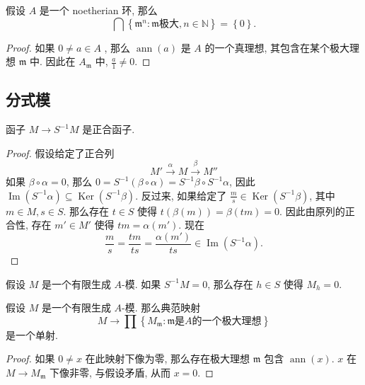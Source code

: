 \begin{proposition}
  假设 \( A \) 是一个 noetherian 环, 那么
  \[
    \bigcap \left\lbrace \mathfrak{m}^n: \mathfrak{m} \text{极大}, n \in
    \mathbb{N} \right\rbrace = \left\lbrace 0 \right\rbrace.
  \]
\end{proposition}
\begin{proof}
  如果 \( 0 \neq  a \in A \) , 那么 \( \operatorname{ann}(a) \) 是 \( A \)
  的一个真理想, 其包含在某个极大理想 \( \mathfrak{m} \) 中. 因此在 \(
  A_{\mathfrak{m}} \) 中, \( \frac{a}{1} \neq 0 \).
\end{proof}

\subsection{分式模}

\begin{proposition}
  函子 \( M \to S^{-1} M \) 是正合函子.
\end{proposition}
\begin{proof}
  假设给定了正合列
  \[
    M' \xrightarrow{\alpha} M \xrightarrow{\beta} M''
  \]
  如果 \( \beta \circ \alpha = 0 \), 那么 \( 0 = S^{-1}(\beta \circ \alpha) =
  S^{-1} \beta \circ S^{-1} \alpha \), 因此 \( \operatorname{Im} (S^{-1} \alpha)
  \subseteq \operatorname{Ker} (S^{-1}\beta) \). 反过来, 如果给定了 \(
  \frac{m}{s} \in \operatorname{Ker}(S^{-1}\beta) \), 其中 \( m \in M, s \in S
  \). 那么存在 \( t \in S \) 使得 \( t(\beta(m)) = \beta(tm) = 0 \).
  因此由原列的正合性, 存在 \( m' \in M' \) 使得 \( tm = \alpha(m') \). 现在
  \[
    \frac{m}{s} = \frac{tm}{ts} = \frac{\alpha(m')}{ts} \in
    \operatorname{Im}(S^{-1}\alpha).
  \]
\end{proof}

\begin{proposition}
  假设 \( M \) 是一个有限生成 \( A \)-模. 如果 \( S^{-1} M = 0 \), 那么存在 \( h
  \in S \) 使得 \( M_h = 0 \).
\end{proposition}

\begin{proposition}
  假设 \( M \) 是一个有限生成 \( A \)-模. 那么典范映射
  \[
    M \to \prod \left\lbrace M_{\mathfrak{m}}: \mathfrak{m} \text{是} A
    \text{的一个极大理想} \right\rbrace
  \]
  是一个单射.
\end{proposition}
\begin{proof}
  如果 \( 0 \neq  x \) 在此映射下像为零, 那么存在极大理想 \( \mathfrak{m} \)
  包含 \( \operatorname{ann}(x) \). \( x \) 在 \( M \to M_{\mathfrak{m}} \)
  下像非零, 与假设矛盾, 从而 \( x = 0 \).
\end{proof}

